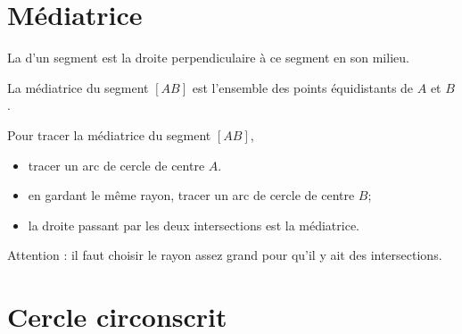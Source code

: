 



\section{Médiatrice}

\begin{definition}
    La  d'un segment est la droite perpendiculaire à ce segment en son milieu.
\end{definition}

\begin{center}
   
\end{center}

\begin{propriete}
    La médiatrice du segment \( [AB]\) est l'ensemble des points équidistants de \( A\) et \( B\).
\end{propriete}

Pour tracer la médiatrice du segment \( [AB]\), 
\begin{itemize}
    \item tracer un arc de cercle de centre \( A\).
    \item en gardant le même rayon, tracer un arc de cercle de centre \( B\);
    \item la droite passant par les deux intersections est la médiatrice.
\end{itemize}
Attention : il faut choisir le rayon assez grand pour qu'il y ait des intersections.

\begin{center}
   
\end{center}

\section{Cercle circonscrit}

